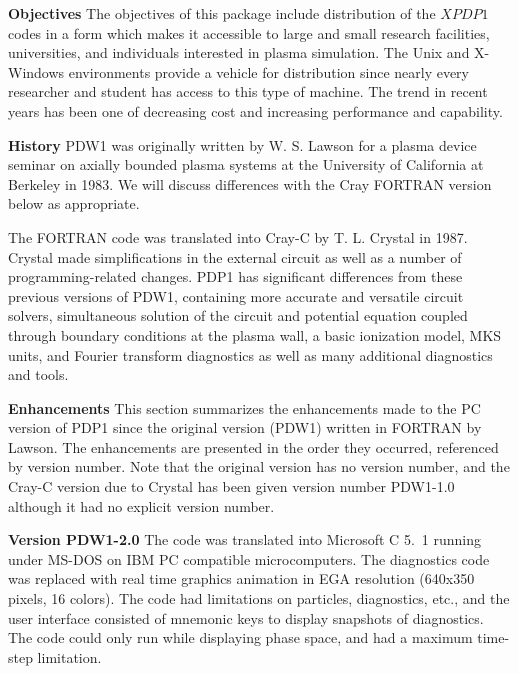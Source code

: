 \begin{section}
\begin{subsection}
\end{subsection}

\begin{subsection}
{\bf Objectives}
   The objectives of this package include distribution of the $XPDP1$ codes in
   a
   form which makes it accessible to large and small research facilities,
   universities, and individuals interested in plasma simulation.  The Unix and
   X-Windows environments provide a vehicle for distribution since nearly every
   researcher and student has access to this type of machine.  The trend in
   recent years has been one of decreasing cost and increasing performance and
   capability.
\end{subsection}
		
\begin{subsection}
{\bf History}
   \mbox{PDW1} was originally written by W. S. Lawson for a plasma device seminar on
   axially bounded plasma systems at the University of California at Berkeley
   in 1983. We will discuss
   differences with the Cray \mbox{FORTRAN} version below as appropriate.
\vspace{.2in}

\noindent
   The \mbox{FORTRAN} code was translated into \mbox{Cray-C} by T. L.
   Crystal in 1987.
   Crystal made simplifications in the external circuit as well as a number of
   programming-related changes.  \mbox{PDP1} has significant differences 
   from these
   previous versions of \mbox{PDW1}, containing more accurate and 
   versatile circuit
   solvers, simultaneous solution of the circuit and potential equation coupled
   through boundary conditions at the plasma wall, a basic ionization model,
   MKS units, and Fourier transform diagnostics as well as many additional
   diagnostics and tools.
\end{subsection}

\begin{subsection}
{\bf Enhancements}
   This section summarizes the enhancements made to the \mbox{PC}
   version of \mbox{PDP1}
   since the original version (\mbox{PDW1}) written in \mbox{FORTRAN}
   by Lawson.  The
   enhancements are presented in the order they occurred, referenced by version
   number.  Note that the original version has no version number, and the
   \mbox{Cray-C} version due to Crystal has been given version number 
   \mbox{PDW1-1.0}
   although it had no explicit version number.

\begin{subsubsection}
{\bf Version \mbox{PDW1-2.0}}
      The code was translated into Microsoft C 5.~1 running under
      \mbox{MS-DOS} on \mbox{IBM}
      \mbox{PC} compatible microcomputers.  The diagnostics code was replaced with
      real time graphics animation in \mbox{EGA} resolution (640x350 pixels, 16
      colors).  The code had limitations on particles, diagnostics, etc., and
      the user interface consisted of mnemonic keys to display snapshots of
      diagnostics.  The code could only run while displaying phase space, and
      had a maximum time-step limitation.
\vspace{.2in}


\end{subsubsection}
\end{subsection}
\end{section}
